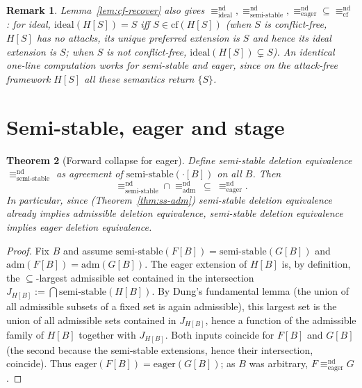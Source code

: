 \documentclass{amsart}
\newtheorem{theorem}{Theorem}
\newtheorem{remark}[theorem]{Remark}
\theoremstyle{remark}
\begin{document}
\begin{remark}\label{rem:cf-others}
Lemma~\ref{lem:cf-recover} also gives
$\equiv^{\mathrm{nd}}_{\mathrm{ideal}},
\equiv^{\mathrm{nd}}_{\mathrm{semi\text{-}stable}},
\equiv^{\mathrm{nd}}_{\mathrm{eager}}\subseteq
\equiv^{\mathrm{nd}}_{\mathrm{cf}}$: for ideal, $\mathrm{ideal}(H[S])=S$ iff
$S\in\mathrm{cf}(H[S])$ (when $S$ is conflict-free, $H[S]$ has no attacks, its
unique preferred extension is $S$ and hence its ideal extension is $S$; when $S$
is not conflict-free, $\mathrm{ideal}(H[S])\subsetneq S$).  An identical one-line
computation works for semi-stable and eager, since on the attack-free framework
$H[S]$ all these semantics return $\{S\}$.
\end{remark}

\section{Semi-stable, eager and stage}\label{sec:ss}

\begin{theorem}[Forward collapse for eager]\label{thm:eager-forward}
Define semi-stable deletion equivalence
$\equiv^{\mathrm{nd}}_{\mathrm{semi\text{-}stable}}$ as agreement of
$\mathrm{semi\text{-}stable}(\cdot[B])$ on all $B$.  Then
\[
\equiv^{\mathrm{nd}}_{\mathrm{semi\text{-}stable}}\cap
\equiv^{\mathrm{nd}}_{\mathrm{adm}}\ \subseteq\
\equiv^{\mathrm{nd}}_{\mathrm{eager}} .
\]
In particular, since (Theorem~\ref{thm:ss-adm}) semi-stable deletion
equivalence already implies admissible deletion equivalence, semi-stable
deletion equivalence implies eager deletion equivalence.
\end{theorem}

\begin{proof}
Fix $B$ and assume $\mathrm{semi\text{-}stable}(F[B])=
\mathrm{semi\text{-}stable}(G[B])$ and $\mathrm{adm}(F[B])=\mathrm{adm}(G[B])$.
The eager extension of $H[B]$ is, by definition, the $\subseteq$-largest
admissible set contained in the intersection $J_{H[B]}:=\bigcap
\mathrm{semi\text{-}stable}(H[B])$.  By Dung's fundamental lemma (the union of
all admissible subsets of a fixed set is again admissible), this largest set is
the union of all admissible sets contained in $J_{H[B]}$, hence a function of the
admissible family of $H[B]$ together with $J_{H[B]}$.  Both inputs coincide for
$F[B]$ and $G[B]$ (the second because the semi-stable extensions, hence their
intersection, coincide).  Thus $\mathrm{eager}(F[B])=\mathrm{eager}(G[B])$; as
$B$ was arbitrary, $F\equiv^{\mathrm{nd}}_{\mathrm{eager}}G$.
\end{proof}
\end{document}

